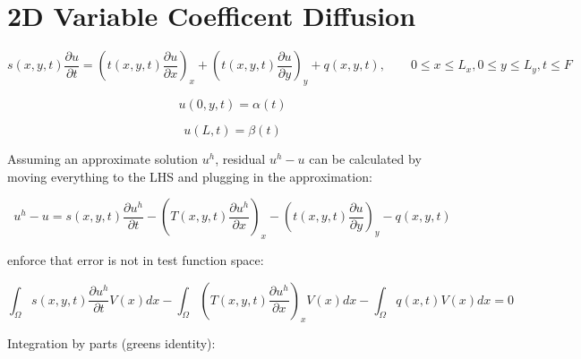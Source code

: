 \documentclass[11pt]{article}
\begin{document}
\section{2D Variable Coefficent Diffusion}

$$s(x, y, t)\frac{\partial u}{\partial t} = \left(t(x, y, t)\frac{\partial u}{\partial x}\right)_x + \left(t(x, y, t)\frac{\partial u}{\partial y}\right)_y + q(x, y, t), \qquad 0 \leq x \leq L_x, 0 \leq y \leq L_y, t \leq F$$


$$u(0, y, t) = \alpha(t)$$

$$u(L,t) = \beta(t)$$

Assuming an approximate solution $u^h$, residual $u^h - u$ can be calculated by moving everything to the LHS and plugging in the approximation:

$$u^h - u = s(x, y, t)\frac{\partial u^h}{\partial t} - \left(T(x, y, t)\frac{\partial u^h}{\partial x}\right)_x -\left(t(x, y, t)\frac{\partial u}{\partial y}\right)_y - q(x, y, t)$$

enforce that error is not in test function space:

$$\int_\Omega s(x, y, t)\frac{\partial u^h}{\partial t}V(x) dx -  \int_\Omega \left(T(x, y, t)\frac{\partial u^h}{\partial x}\right)_x V(x) dx - \int_\Omega q(x,t) V(x) dx = 0$$

Integration by parts (greens identity):
\end{document}
